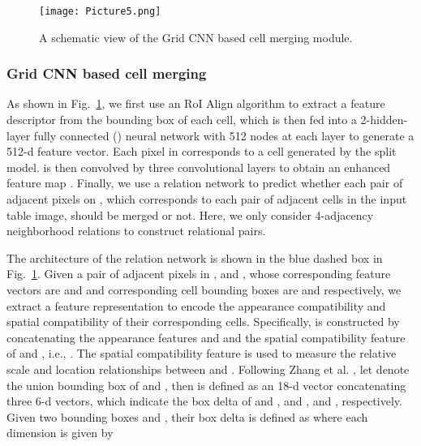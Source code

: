 \documentclass[final,3p,times,twocolumn]{elsarticle}
\begin{document}
\begin{figure}[t]
    \centering
    \setlength{\abovecaptionskip}{-0.2cm}
    \texttt{[image: Picture5.png]}
    \caption{A schematic view of the Grid CNN based cell merging module.}
    \label{fig:GridCNN}
\end{figure}

\subsubsection{Grid CNN based cell merging} 
\label{subsubsec:GridCNN}
{\color{black}{ Based on the compact grid representation, we introduce a Grid CNN module to aggregate context information effectively with several stacked convolution layers to improve cell merging accuracy.}} As shown in Fig.~\ref{fig:GridCNN}, we first use an RoI Align algorithm to extract a  feature descriptor from the bounding box of each cell, which is then fed into a 2-hidden-layer fully connected () neural network with 512 nodes at each layer to generate a 512-d feature vector. {\color{black}{Assume that the detected cells are arranged in  rows and  columns, then the corresponding feature vectors will construct a new feature map .}} Each pixel in  corresponds to a cell generated by the split model.  is then convolved by three  convolutional layers to obtain an enhanced feature map . Finally, we use a relation network \cite{zhang2017relationship} to predict whether each pair of adjacent pixels on , which corresponds to each pair of adjacent cells in the input table image, should be merged or not. Here, we only consider 4-adjacency neighborhood relations to construct relational pairs.

The architecture of the relation network is shown in the blue dashed box in Fig.~\ref{fig:GridCNN}. Given a pair of adjacent pixels in ,  and , whose corresponding feature vectors are  and  and corresponding cell bounding boxes are  and  respectively, we extract a feature representation  to encode the appearance compatibility and spatial compatibility of their corresponding cells. Specifically,  is constructed by concatenating the appearance features  and  and the spatial compatibility feature  of  and , i.e., . The spatial compatibility feature  is used to measure the relative scale and location relationships between  and . Following Zhang et al. \cite{zhang2017relationship}, let  denote the union bounding box of  and , then  is defined as an 18-d vector concatenating three 6-d vectors, which indicate the box delta of  and ,  and ,  and , respectively. Given two bounding boxes  and , their box delta is defined as  where each dimension is given by
\end{document}
